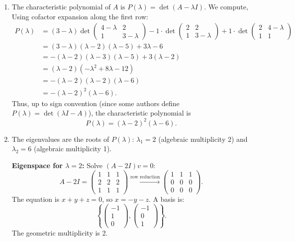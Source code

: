 \documentclass[12pt]{article}
\begin{document}
\begin{correctionbox}
\begin{enumerate}
    \item The characteristic polynomial of $A$ is $P(\lambda) = \det(A - \lambda I)$. We compute, Using cofactor expansion along the first row:
    \begin{align*}
    P(\lambda) &= (3-\lambda)\det\begin{pmatrix}4-\lambda & 2 \\ 1 & 3-\lambda\end{pmatrix} 
    - 1\cdot\det\begin{pmatrix}2 & 2 \\ 1 & 3-\lambda\end{pmatrix} 
    + 1\cdot\det\begin{pmatrix}2 & 4-\lambda \\ 1 & 1\end{pmatrix} \\
    &= (3-\lambda)(\lambda-2)(\lambda-5) + 3\lambda - 6 \\
    &= -( \lambda-2)(\lambda-3)(\lambda-5) + 3(\lambda-2) \\
    &= (\lambda-2)(-\lambda^2 + 8\lambda - 12) \\
    &= -(\lambda-2)(\lambda-2)(\lambda-6) \\
    &= -(\lambda-2)^2(\lambda-6).
    \end{align*}
    Thus, up to sign convention (since some authors define $P(\lambda)=\det(\lambda I-A)$), the characteristic polynomial is 
    \[
    P(\lambda) = (\lambda-2)^2(\lambda-6).
    \]

    \item The eigenvalues are the roots of $P(\lambda)$: $\lambda_1 = 2$ (algebraic multiplicity 2) and $\lambda_2 = 6$ (algebraic multiplicity 1).

    \textbf{Eigenspace for $\lambda = 2$:} Solve $(A - 2I)v = 0$:
    \[
    A - 2I = \begin{pmatrix}
    1 & 1 & 1 \\
    2 & 2 & 2 \\
    1 & 1 & 1
    \end{pmatrix} \xrightarrow{\text{row reduction}} \begin{pmatrix}
    1 & 1 & 1 \\
    0 & 0 & 0 \\
    0 & 0 & 0
    \end{pmatrix}.
    \]
    The equation is $x + y + z = 0$, so $x = -y - z$. A basis is:
    \[
    \left\{ \begin{pmatrix}-1 \\ 1 \\ 0\end{pmatrix}, \begin{pmatrix}-1 \\ 0 \\ 1\end{pmatrix} \right\}.
    \]
    The geometric multiplicity is 2.


\end{enumerate}
\end{correctionbox}
\end{document}
